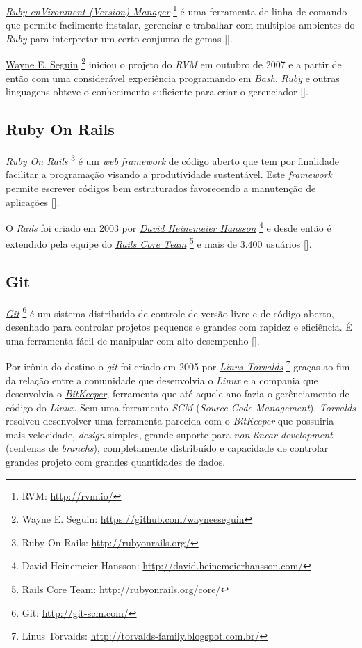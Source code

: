 \emph{\href{http://rvm.io/}{Ruby enVironment (Version) Manager}} \footnote{RVM: \url{http://rvm.io/}} é uma 
ferramenta de linha de comando que permite facilmente instalar, gerenciar e trabalhar com multiplos ambientes 
do \emph{Ruby} para interpretar um certo conjunto de gemas [].

 \href{https://github.com/wayneeseguin}{Wayne E. Seguin} \footnote{Wayne E. Seguin: 
 \url{https://github.com/wayneeseguin}} iniciou o projeto do \emph{RVM} em outubro de 2007
e a partir de então com uma considerável experiência programando em \emph{Bash}, \emph{Ruby} e outras 
linguagens obteve o conhecimento suficiente para criar o gerenciador [].

\subsection{Ruby On Rails}

\emph{\href{http://rubyonrails.org/}{Ruby On Rails}} \footnote{Ruby On Rails: \url{http://rubyonrails.org/}} 
é um \emph{web framework} de código aberto que tem por finalidade facilitar a programação
visando a produtividade sustentável. Este \emph{framework} permite escrever códigos bem estruturados
favorecendo a manutenção de aplicações [].

O \emph{Rails} foi criado em 2003 por \emph{\href{http://david.heinemeierhansson.com/}{David Heinemeier Hansson}}
\footnote{David Heinemeier Hansson: \url{http://david.heinemeierhansson.com/}} e desde então é extendido 
pela equipe do \emph{\href{http://rubyonrails.org/core/}{Rails Core Team}} 
\footnote{Rails Core Team: \url{http://rubyonrails.org/core/}} e mais de 3.400 usuários 
[].

\subsection{Git}

\emph{\href{http://git-scm.com/}{Git}} \footnote{Git: \url{http://git-scm.com/}} é um sistema distribuído de 
controle de versão livre e de código aberto, desenhado para controlar projetos pequenos e grandes com 
rapidez e eficiência. É uma ferramenta fácil de manipular com alto desempenho [].

Por irônia do destino o \emph{git} foi criado em 2005 por 
\emph{\href{http://torvalds-family.blogspot.com.br/}{Linus Torvalds}} 
\footnote{Linus Torvalds: \url{http://torvalds-family.blogspot.com.br/}} graças ao fim da relação entre a 
comunidade que desenvolvia o \emph{Linux} e a compania que desenvolvia o 
\emph{\href{http://www.bitkeeper.com/}{BitKeeper}}, ferramenta que até aquele ano fazia o gerênciamento de 
código do \emph{Linux}. Sem uma ferramento \emph{SCM} (\emph{Source Code Management}), \emph{Torvalds} 
resolveu desenvolver uma ferramenta parecida com o \emph{BitKeeper} que possuiria mais velocidade,
\emph{design} simples, grande suporte para \emph{non-linear development} (centenas de \emph{branchs}), 
completamente distribuído e capacidade de controlar grandes projeto com grandes quantidades de dados.


